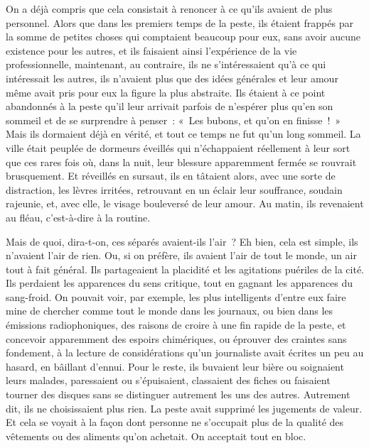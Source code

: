 \documentclass[french,twoside]{book} %
\begin{document}
On a déjà compris que cela consistait à renoncer à ce qu’ils avaient de plus personnel. Alors que dans les premiers temps de la peste, ils étaient frappés par la somme de petites choses qui comptaient beaucoup pour eux, sans avoir aucune existence pour les autres, et ils faisaient ainsi l’expérience de la vie professionnelle, maintenant, au contraire, ils ne s’intéressaient qu’à ce qui intéressait les autres, ils n’avaient plus que des idées générales et leur amour même avait pris pour eux la figure la plus abstraite. Ils étaient à ce point abandonnés à la peste qu’il leur arrivait parfois de n’espérer plus qu’en son sommeil et de se surprendre à penser : « Les bubons, et qu’on en finisse ! » Mais ils dormaient déjà en vérité, et tout ce temps ne fut qu’un long sommeil. La ville était peuplée de dormeurs éveillés qui n’échappaient réellement à leur sort que ces rares fois où, dans la nuit, leur blessure apparemment fermée se rouvrait brusquement. Et réveillés en sursaut, ils en tâtaient alors, avec une sorte de distraction, les lèvres irritées, retrouvant en un éclair leur souffrance, soudain rajeunie, et, avec elle, le visage bouleversé de leur amour. Au matin, ils revenaient au fléau, c’est-à-dire à la routine.\par
Mais de quoi, dira-t-on, ces séparés avaient-ils l’air ? Eh bien, cela est simple, ils n’avaient l’air de rien. Ou, si on préfère, ils avaient l’air de tout le monde, un air tout à fait général. Ils partageaient la placidité et les agitations puériles de la cité. Ils perdaient les apparences du sens critique, tout en gagnant les apparences du sang-froid. On pouvait voir, par exemple, les plus intelligents d’entre eux faire mine de chercher comme tout le monde dans les journaux, ou bien dans les émissions radiophoniques, des raisons de croire à une fin rapide de la peste, et concevoir apparemment des espoirs chimériques, ou éprouver des craintes sans fondement, à la lecture de considérations qu’un journaliste avait écrites un peu au hasard, en bâillant d’ennui. Pour le reste, ils buvaient leur bière ou soignaient leurs malades, paressaient ou s’épuisaient, classaient des fiches ou faisaient tourner des disques sans se distinguer autrement les uns des autres. Autrement dit, ils ne choisissaient plus rien. La peste avait supprimé les jugements de valeur. Et cela se voyait à la façon dont personne ne s’occupait plus de la qualité des vêtements ou des aliments qu’on achetait. On acceptait tout en bloc.\par
\end{document}
